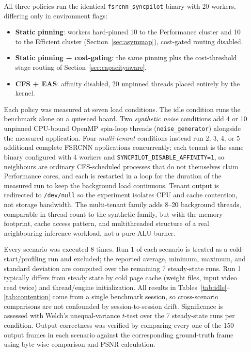 \documentclass[conference]{IEEEtran}
\begin{document}
All three policies run the identical \texttt{fsrcnn\_syncpilot} binary with 20 workers, differing only in environment flags:
\begin{itemize}
\item \textbf{Static pinning}: workers hard-pinned 10 to the Performance cluster and 10 to the Efficient cluster (Section~\ref{sec:asymmap}), cost-gated routing disabled.
\item \textbf{Static pinning + cost-gating}: the same pinning plus the cost-threshold stage routing of Section~\ref{sec:capacityaware}.
\item \textbf{CFS + EAS}: affinity disabled, 20 unpinned threads placed entirely by the kernel.
\end{itemize}

Each policy was measured at seven load conditions. The idle condition runs the benchmark alone on a quiesced board. Two \emph{synthetic noise} conditions add 4 or 10 unpinned CPU-bound OpenMP spin-loop threads (\texttt{noise\_generator}) alongside the measured application. Four \emph{multi-tenant} conditions instead run 2, 3, 4, or 5 additional complete FSRCNN applications concurrently; each tenant is the same binary configured with 4 workers and \texttt{SYNCPILOT\_DISABLE\_AFFINITY=1}, so neighbours are ordinary CFS-scheduled processes that do not themselves claim Performance cores, and each is restarted in a loop for the duration of the measured run to keep the background load continuous. Tenant output is redirected to \texttt{/dev/null} so the experiment isolates CPU and cache contention, not storage bandwidth. The multi-tenant family adds 8--20 background threads, comparable in thread count to the synthetic family, but with the memory footprint, cache access pattern, and multithreaded structure of a real neighbouring inference workload, not a pure ALU burner.

Every scenario was executed 8 times. Run 1 of each scenario is treated as a cold-start/profiling run and excluded; the reported average, minimum, maximum, and standard deviation are computed over the remaining 7 steady-state runs. Run 1 typically differs from steady state by cold page cache (weight files, input video read twice) and thread/engine initialization. All results in Tables~\ref{tab:idle}--\ref{tab:contention} come from a single benchmark session, so cross-scenario comparisons are not confounded by session-to-session drift. Significance is assessed with Welch's unequal-variance $t$-test over the 7 steady-state runs per condition. Output correctness was verified by comparing every one of the 150 output frames in each scenario against the corresponding ground-truth frame using byte-wise comparison and PSNR calculation.
\end{document}
